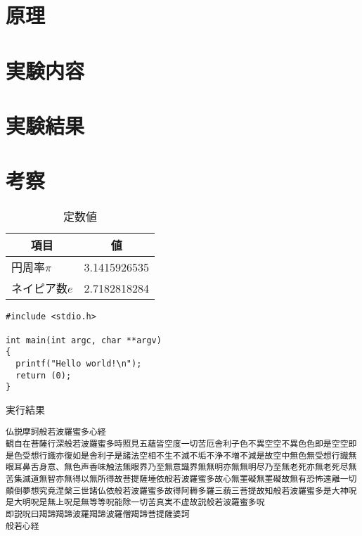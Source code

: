 \documentclass[a4j,uplatex]{jsarticle}
\begin{document}
\section{原理}
\section{実験内容}
\section{実験結果}
\section{考察}


\begin{table}[H]
  \begin{center}
    \caption{定数値}
    \label{tb:env}
    \begin{tabular}{|l|r|} \hline
      \multicolumn{1}{|c|}{項目} & \multicolumn{1}{c|}{値} \\ \hline \hline
      円周率$\pi$ & 3.1415926535 \\ \hline
      ネイピア数$e$ & 2.7182818284 \\ \hline
    \end{tabular}
  \end{center}
\end{table}



\begin{lstlisting}[caption=main関数,label=src:main,xleftmargin=0zw]
#include <stdio.h>

int main(int argc, char **argv)
{
  printf("Hello world!\n");
  return (0);
}
\end{lstlisting}


% 


\begin{result}{実行結果}
\begin{verbatim}
仏説摩訶般若波羅蜜多心経
観自在菩薩行深般若波羅蜜多時照見五蘊皆空度一切苦厄舎利子色不異空空不異色色即是空空即是色受想行識亦復如是舎利子是諸法空相不生不滅不垢不浄不増不減是故空中無色無受想行識無眼耳鼻舌身意、無色声香味触法無眼界乃至無意識界無無明亦無無明尽乃至無老死亦無老死尽無苦集滅道無智亦無得以無所得故菩提薩埵依般若波羅蜜多故心無罣礙無罣礙故無有恐怖遠離一切顛倒夢想究竟涅槃三世諸仏依般若波羅蜜多故得阿耨多羅三藐三菩提故知般若波羅蜜多是大神呪是大明呪是無上呪是無等等呪能除一切苦真実不虚故説般若波羅蜜多呪
即説呪曰羯諦羯諦波羅羯諦波羅僧羯諦菩提薩婆訶
般若心経
\end{verbatim}
\end{result}
\end{document}
